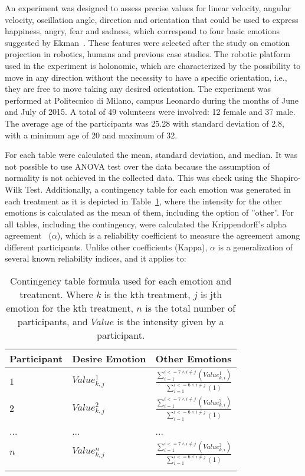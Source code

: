 An experiment was designed to assess precise values for linear velocity, angular velocity, oscillation angle, direction and orientation that could be used to express happiness, angry, fear and sadness, which correspond to four basic emotions suggested by Ekman~\cite{Ekman2001}. These features were selected after the study on emotion projection in robotics, humans and previous case studies. The robotic platform used in the experiment is holonomic, which are characterized by the possibility to move in any direction without the necessity to have a specific orientation, i.e., they are free to move taking any desired orientation. The experiment was performed at Politecnico di Milano, campus Leonardo during the months of June and July of 2015.  A total of 49 volunteers were involved: 12 female and 37 male. The average age of the participants was 25.28 with standard deviation of 2.8, with a minimum age of 20 and maximum of 32. 

For each table were calculated the mean, standard deviation, and median. It was not possible to use  ANOVA test over the data because the assumption of normality is not achieved in the collected data. This was check using the Shapiro-Wilk Test.
Additionally, a contingency table for each emotion was generated in each treatment as it is depicted in  Table~\ref{table:table_contingency},  where the intensity for the other emotions is calculated as the mean of them, including the option of ''other''. For all tables, including the contingency, were calculated the Krippendorff's alpha agreement~\cite{Krippendorff2007} ($\alpha$), which is a reliability coefficient to measure the agreement among different participants. Unlike other coefficients (Kappa), $\alpha$ is a generalization of several known reliability indices, and it applies to:

\begin{table}
\caption{Contingency table formula used for each emotion and treatment. Where $k$ is the kth treatment, $j$ is jth emotion for the kth treatment, $n$ is the total number of participants, and $Value$ is the intensity given by a participant.}
\label{table:table_contingency}
\small
\begin{tabular}{|l|l|l|}
\hline
Participant & Desire Emotion & Other Emotions \\
\hline
$1$ & $Value_{k,j}^{1}$  & $\frac{\sum_{i=1}^{i<=7 \wedge i \neq j}(Value_{k,i}^{1})}{\sum_{i=1}^{i<=6 \wedge i \neq j}(1)}$\\
\hline
$2$ & $Value_{k,j}^{2}$ & $\frac{\sum_{i=1}^{i<=7 \wedge i \neq j}(Value_{k,i}^{2})}{\sum_{i=1}^{i<=6 \wedge i \neq j}(1)}$\\
\hline
... & ... & ...\\
\hline
$n$ & $Value_{k,j}^{n}$ & $\frac{\sum_{i=1}^{i<=7 \wedge i \neq j}(Value_{k,i}^{2})}{\sum_{i=1}^{i<=6 \wedge i \neq j}(1)}$\\
\hline
\multicolumn{3}{c}{}
\end{tabular}
\end{table}

